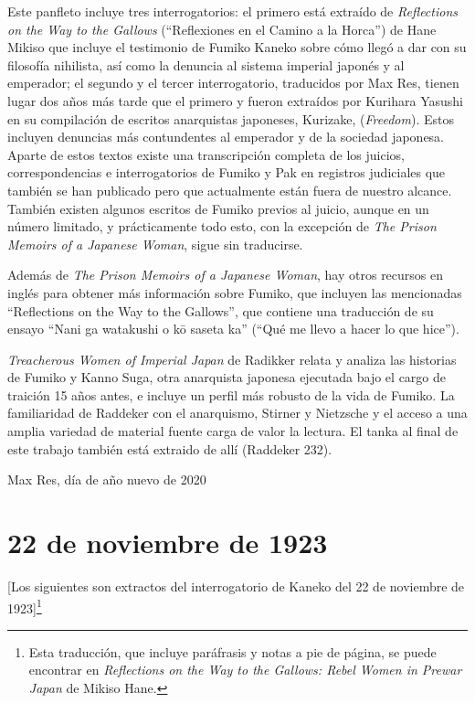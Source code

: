 \documentclass[
]{book}
\begin{document}
Este panfleto incluye tres interrogatorios: el primero está extraído de \emph{Reflections on the Way to the Gallows} (``Reflexiones en el Camino a la Horca'') de Hane Mikiso que incluye el testimonio de Fumiko Kaneko sobre cómo llegó a dar con su filosofía nihilista, así como la denuncia al sistema imperial japonés y al emperador; el segundo y el tercer interrogatorio, traducidos por Max Res, tienen lugar dos años más tarde que el primero y fueron extraídos por Kurihara Yasushi en su compilación de escritos anarquistas japoneses, Kurizake, (\emph{Freedom}). Estos incluyen denuncias más contundentes al emperador y de la sociedad japonesa. Aparte de estos textos existe una transcripción completa de los juicios, correspondencias e interrogatorios de Fumiko y Pak en registros judiciales que también se han publicado pero que actualmente están fuera de nuestro alcance. También existen algunos escritos de Fumiko previos al juicio, aunque en un número limitado, y prácticamente todo esto, con la excepción de \emph{The Prison Memoirs of a Japanese Woman}, sigue sin traducirse.

Además de \emph{The Prison Memoirs of a Japanese Woman}, hay otros recursos en inglés para obtener más información sobre Fumiko, que incluyen las mencionadas ``Reflections on the Way to the Gallows'', que contiene una traducción de su ensayo ``Nani ga watakushi o kō saseta ka'' (``Qué me llevo a hacer lo que hice'').

\emph{Treacherous Women of Imperial Japan} de Radikker relata y analiza las historias de Fumiko y Kanno Suga, otra anarquista japonesa ejecutada bajo el cargo de traición 15 años antes, e incluye un perfil más robusto de la vida de Fumiko. La familiaridad de Raddeker con el anarquismo, Stirner y Nietzsche y el acceso a una amplia variedad de material fuente carga de valor la lectura. El tanka al final de este trabajo también está extraido de allí (Raddeker 232).

Max Res, día de año nuevo de 2020

\hypertarget{de-noviembre-de-1923}{%
\chapter*{22 de noviembre de 1923}\label{de-noviembre-de-1923}}

{[}Los siguientes son extractos del interrogatorio de Kaneko del 22 de noviembre de 1923{]}\footnote{Esta traducción, que incluye paráfrasis y notas a pie de página, se puede encontrar en \emph{Reflections on the Way to the Gallows: Rebel Women in Prewar Japan} de Mikiso Hane.}
\end{document}
